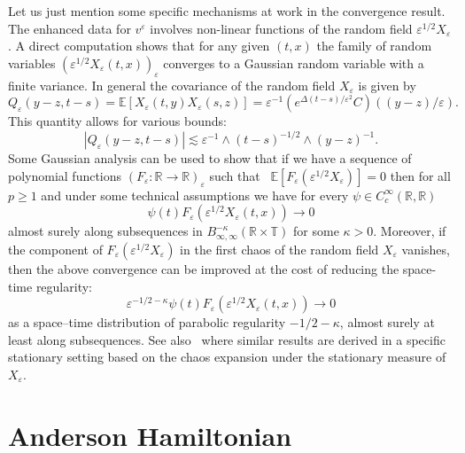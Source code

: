 \documentclass[a4paper, 11pt]{article}
\begin{document}
Let us just mention some specific mechanisms at work in the convergence
result. The enhanced data for $v^\varepsilon$ involves non-linear functions of the random field
$\varepsilon^{1 / 2} X_{\varepsilon}$. A direct computation shows that for any
given $(t, x)$ the family of random variables $(\varepsilon^{1 / 2} X_{\varepsilon} (t, x))_\varepsilon$ converges to a Gaussian random variable with a finite variance. In general the covariance of the random field
$X_{\varepsilon}$ is given by
\[ Q_{\varepsilon} (y - z, t - s) =\mathbb{E} [X_{\varepsilon} (t, y)
   X_{\varepsilon} (s, z)] = \varepsilon^{- 1} (e^{\Delta (t - s) /
   \varepsilon^2} C) ((y - z) / \varepsilon). \]
This quantity allows for various bounds:
\[ | Q_{\varepsilon} (y - z, t - s) | \lesssim \varepsilon^{- 1} \wedge (t -
   s)^{- 1 / 2} \wedge (y - z)^{- 1} . \]
Some Gaussian analysis can be used to show that if we have a sequence of
polynomial functions $(F_{\varepsilon} : \mathbb{R} \rightarrow
\mathbb{R})_{\varepsilon}$ such that \ $\mathbb{E} [F_\varepsilon(\varepsilon^{1 / 2}
X_{\varepsilon})] = 0$ then for all $p \geqslant 1$ and under some technical
assumptions we have for every $\psi \in C^\infty_c(\mathbb R,\mathbb R)$
\[ {\psi (t)} F_{\varepsilon} (\varepsilon^{1 / 2} X_{\varepsilon} (t, x))
   \rightarrow 0 \]
almost surely along subsequences in $B^{- \kappa}_{\infty, \infty}
(\mathbb{R} \times \mathbb{T})$ for some $\kappa > 0$. Moreover, if the component of
$F_{\varepsilon} (\varepsilon^{1 / 2} X_{\varepsilon})$ in
the first chaos of the random field $X_\varepsilon$ vanishes, then the above convergence can be improved
at the cost of reducing the space-time regularity:
\[ \varepsilon^{- 1 / 2 - \kappa} \psi (t) F_{\varepsilon} (\varepsilon^{1 /
   2} X_{\varepsilon} (t, x)) \rightarrow 0 \]
as a space--time distribution of parabolic regularity $- 1 / 2 - \kappa$, almost surely
at least along subsequences. See also~\cite{gubinelli_hairer--quastel_2016} where similar results are derived in a specific stationary setting based on the chaos expansion under the stationary measure of $X_\varepsilon$.


\section{Anderson Hamiltonian}
\label{sec:operators1}
\end{document}

